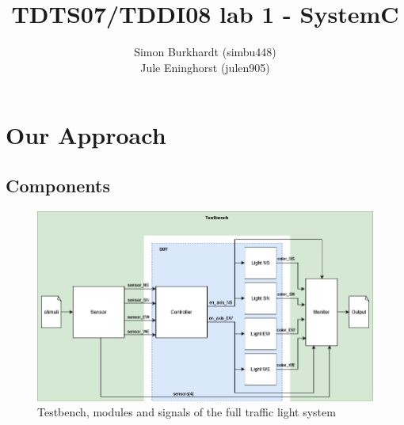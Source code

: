 \documentclass[10pt,bibliography=totocnumbered,listof=totocnumbered, footsepline, headsepline]{scrreprt}
\begin{document}
\title{TDTS07/TDDI08 lab 1 - SystemC}
\author{Simon Burkhardt (simbu448)\\ Jule Eninghorst (julen905)}
\maketitle

\section{Our Approach}
    \subsection{Components}
    
    \begin{figure}[h]
    	\centerline{\includegraphics[width=.9\textwidth]{testbench_flowchart.png}}
    	\caption{Testbench, modules and signals of the full traffic light system}
    	\label{fig:Controller_Diagram}
    \end{figure}
    
\end{document}
